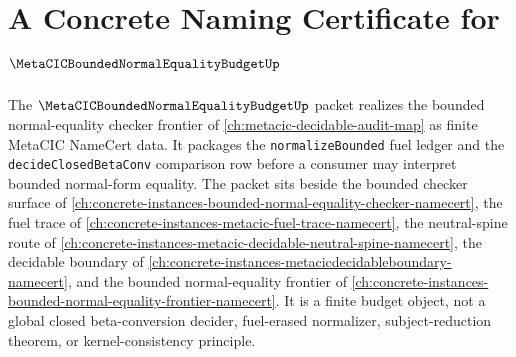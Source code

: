 \chapter{A Concrete Naming Certificate for $\MetaCICBoundedNormalEqualityBudgetUp$}
\label{ch:concrete-instances-metacic-bounded-normal-equality-budget-namecert}

The $\MetaCICBoundedNormalEqualityBudgetUp$ packet realizes the bounded normal-equality checker frontier of \autoref{ch:metacic-decidable-audit-map} as finite MetaCIC NameCert data. It packages the \texttt{normalizeBounded} fuel ledger and the \texttt{decideClosedBetaConv} comparison row before a consumer may interpret bounded normal-form equality. The packet sits beside the bounded checker surface of \autoref{ch:concrete-instances-bounded-normal-equality-checker-namecert}, the fuel trace of \autoref{ch:concrete-instances-metacic-fuel-trace-namecert}, the neutral-spine route of \autoref{ch:concrete-instances-metacic-decidable-neutral-spine-namecert}, the decidable boundary of \autoref{ch:concrete-instances-metacicdecidableboundary-namecert}, and the bounded normal-equality frontier of \autoref{ch:concrete-instances-bounded-normal-equality-frontier-namecert}. It is a finite budget object, not a global closed beta-conversion decider, fuel-erased normalizer, subject-reduction theorem, or kernel-consistency principle.

